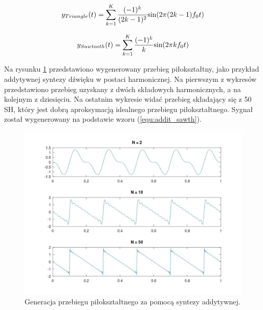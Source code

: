 \begin{equation} \label{equ:addit_trng}
y_{Triangle}(t) = \sum_{k=1}^{K} \frac{(-1)^k}{(2k-1)^2} \text{sin}(2\pi (2k-1)f_{0}t)  \\
\end{equation}

\begin{equation} \label{equ:addit_sawth}
y_{Sawtooth}(t) = \sum_{k=1}^{K} \frac{(-1)^k}{k} \text{sin}(2\pi kf_{0}t) \\
\end{equation}

Na rysunku \ref{rys:add_sawtooth} przedstawiono wygenerowany przebieg piłokształtny, jako przykład addytywnej syntezy dźwięku w postaci harmonicznej. Na pierwszym z wykresów przedstawiono przebieg uzyskany z dwóch składowych harmonicznych, a na kolejnym z dziesięciu. Na ostatnim wykresie widać przebieg składający się z 50 SH, który jest dobrą aproksymacją idealnego przebiegu piłokształtnego. Sygnał został wygenerowany na podstawie wzoru (\ref{equ:addit_sawth}).

\begin{figure}[H]
	\centering
	\includegraphics[width=12cm]{grafiki/add_sawtooth}
	\captionsetup{justification=centering}
	\caption{Generacja przebiegu piłokształtnego za pomocą syntezy addytywnej.}
	\label{rys:add_sawtooth}
\end{figure}


